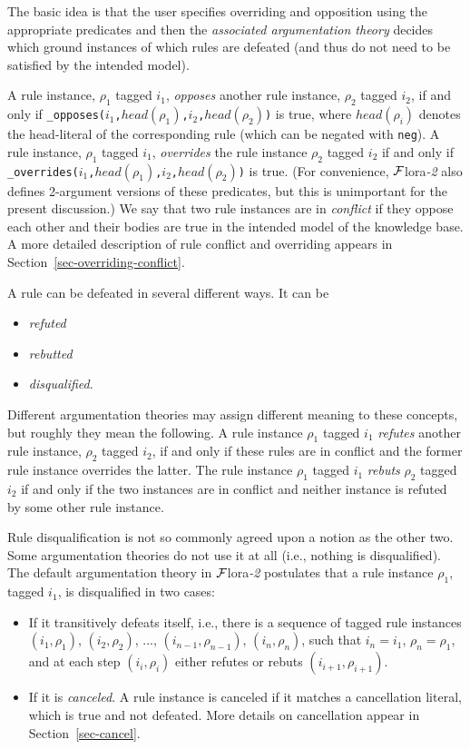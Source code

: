 \documentclass[11pt]{article}
\newcommand{\FLORA}{{\mbox{\sc ${\cal F}${lora}\rm\emph{-2}}}\xspace}
\begin{document}
The basic idea is that the user specifies overriding and
opposition using the appropriate predicates and then the \emph{associated
argumentation theory} decides which ground instances of which rules are
defeated (and thus do not need to be satisfied by the intended model).  

A rule instance, $\rho_1$ tagged $i_1$, \emph{opposes} another rule
instance, $\rho_2$ tagged $i_2$, if and only if
\texttt{\_opposes($i_1$,$head(\rho_1)$,$i_2$,$head(\rho_2)$)} is true,
where $head(\rho_i)$ denotes the head-literal of the corresponding rule
(which can be negated with {\tt neg}). A rule instance, $\rho_1$ tagged
$i_1$, \emph{overrides} the rule instance $\rho_2$ tagged $i_2$ if and
only if \texttt{\_overrides($i_1$,$head(\rho_1)$,$i_2$,$head(\rho_2)$)} is
true. (For convenience, \FLORA also defines 2-argument versions of these
predicates, but this is unimportant for the present discussion.)
We say that two rule instances are in \emph{conflict} if they oppose each other
and their bodies are true in the intended model of the knowledge base.
A more detailed description of rule conflict and overriding appears in
Section~\ref{sec-overriding-conflict}.

A rule can be defeated in several different ways. It can be
\begin{itemize}
\item  \emph{refuted}
\item  \emph{rebutted} 
\item  \emph{disqualified}. 
\end{itemize}
Different argumentation theories may assign different meaning to these
concepts, but roughly they mean the following. A rule instance $\rho_1$
tagged $i_1$ \emph{refutes} another rule instance, $\rho_2$ tagged $i_2$, 
if and only if these rules are in conflict and the former rule instance
overrides the latter. The rule instance $\rho_1$
tagged $i_1$ \emph{rebuts} $\rho_2$ tagged $i_2$ if and only if the two
instances are in conflict and neither instance is refuted by some other
rule instance.

Rule disqualification is not so commonly agreed upon a notion as the other
two.  Some argumentation theories do not use it at all (i.e., nothing is
disqualified).  The default argumentation theory in \FLORA postulates that a
rule instance $\rho_1$, tagged $i_1$, is disqualified in two cases:
\begin{itemize}
\item If it transitively defeats itself, i.e., there is a sequence of
  tagged rule instances $(i_1,\rho_1)$, $(i_2,\rho_2)$, ...,
  $(i_{n-1},\rho_{n-1})$, $(i_n,\rho_n)$, such that $i_n=i_1$,
  $\rho_n=\rho_1$, and at each step $(i_i,\rho_i)$ either refutes or rebuts
  $(i_{i+1},\rho_{i+1})$.
\item If it is \emph{canceled}. A rule instance is canceled if it matches a
  cancellation literal, which is true and not defeated. More details on
  cancellation appear in Section~\ref{sec-cancel}.
\end{itemize}
\end{document}
